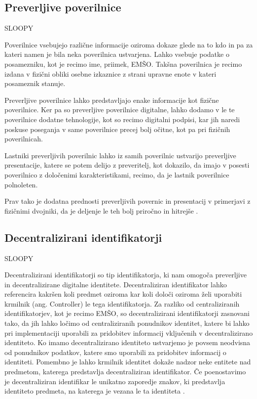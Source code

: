 \documentclass[a4paper,12pt,openright]{book}
\begin{document}
\subsection{Preverljive poverilnice}
SLOOPY

Poverilnice vsebujejo različne informacije oziroma dokaze glede na to kdo in pa za kateri namen je bila neka poverilnica ustvarjena.
Lahko vsebuje podatke o posamezniku, kot je recimo ime, priimek, EMŠO.
Takšna poverilnica je recimo izdana v fizični obliki osebne izkaznice z strani upravne enote v kateri posameznik stanuje.

Preverljive poverilnice lahko predstavljajo enake informacije kot fizične poverilnice.
Ker pa so preverljive poverilnice digitalne, lahko dodamo v le te poverilnice dodatne tehnologije, 
kot so recimo digitalni podpisi, kar jih naredi poskuse poseganja v same poverilnice precej bolj očitne, kot pa pri fizičnih poverilnicah.

Lastniki preverljivih poverilnic lahko iz samih poverilnic ustvarijo preverljive presentacije, katere se potem delijo z preveritelj, kot dokazilo, da imajo v posesti
poverilnico z določenimi karakteristikami, recimo, da je lastnik poverilnice polnoleten.

Prav tako je dodatna prednosti preverljivih povernic in presentacij v primerjavi z fizičnimi dvojniki, da je deljenje le teh bolj priročno in hitrejše \cite{verifiable_credentials}.

\subsection{Decentralizirani identifikatorji}
SLOOPY

Decentralizirani identifikatorji so tip identifikatorja, ki nam omogoča preverljive in decentralizirane digitalne identitete.
Decentraliziran identifikator lahko referencira kakršen koli predmet oziroma kar koli določi oziroma želi 
uporabiti krmilnik (ang. Controller) le tega identifikatorja.
Za razliko od centraliziranih identifikatorjev, kot je recimo EMŠO, so decentralizirani identifikatorji zasnovani tako, da jih
lahko ločimo od centraliziranih ponudnikov identitet, katere bi lahko pri implementaciji uporabili za pridobitev informacij vključenih v decentralizirano identiteto.
Ko imamo decentralizirano identiteto ustvarjemo je povsem neodvisna od ponudnikov podatkov, katere smo uporabili za pridobitev informacij o identiteti.
Pomembno je lahko krmilnik identitet dokaže nadzor neke entitete nad predmetom, katerega predstavlja decentraliziran identifikator.
Če poenostavimo je decentraliziran identifikar le unikatno zaporedje znakov, ki predstavlja identiteto predmeta, 
na katerega je vezana le ta identiteta \cite{decentralized_identifiers}.
\end{document}
